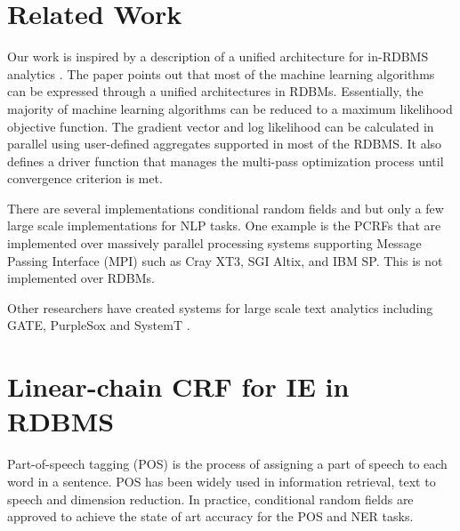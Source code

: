 \documentclass[11pt,letterpaper]{article}
\begin{document}
\section{Related Work}
Our work is inspired by a description of a unified architecture for in-RDBMS analytics \cite{Feng:2012:TUA:2213836.2213874}.
The paper points out that most of the machine learning algorithms can be expressed through
a unified architectures in RDBMs.
Essentially, the majority of machine learning algorithms can be reduced to a maximum likelihood objective function. %
The gradient vector and log likelihood can be calculated in parallel using user-defined aggregates supported in most of the RDBMS.
It also defines a driver function that manages the multi-pass optimization process until convergence criterion is met.

There are several implementations conditional random fields and but only a few 
large scale implementations for NLP tasks.
One example is the PCRFs \cite{phan2004flexcrfs} that are implemented over
massively parallel processing systems supporting Message Passing Interface (MPI) such as 
Cray XT3, SGI Altix, and IBM SP.
This is not implemented over RDBMs.

Other researchers have created systems for large scale text analytics including 
GATE, PurpleSox and SystemT
\cite{Cunningham2011a,Bohannon:2009:PSE:1519103.1519107,Li:2011:SDI:2002440.2002459}. 


\section{Linear-chain CRF for IE in RDBMS}
Part-of-speech tagging (POS) is the process of assigning 
a part of speech to each word in a sentence. POS has been widely used in information retrieval, text to speech and dimension reduction. 
In practice, conditional random fields are approved to achieve the state of art accuracy for the POS and NER tasks.
\end{document}
